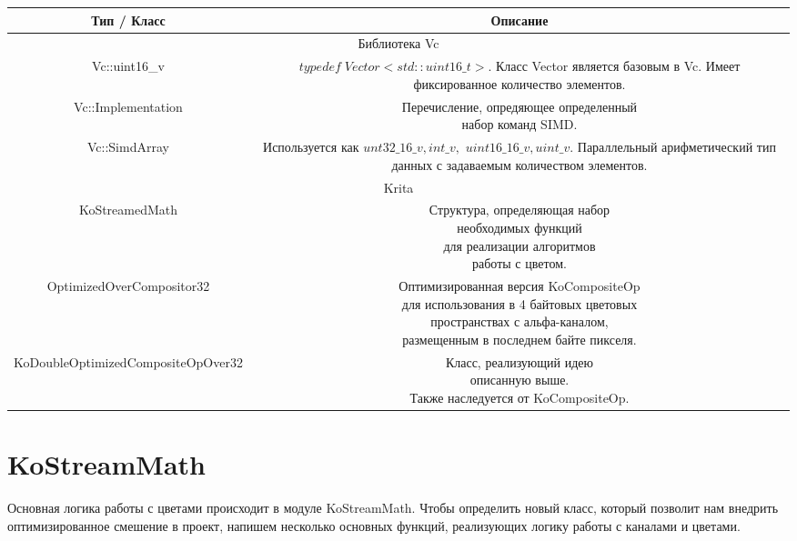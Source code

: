\begin{table}[h!]
	\begin{center}
		\begin{tabular}{|c|c|}
			\hline
			Тип / Класс& Описание \\
			\hline
			\multicolumn{2}{|c|}{Библиотека Vc} \\
			\hline
			Vc::uint16\_v & \specialcell{$typedef\; Vector<std::uint16\_t>$. \\ Класс Vector является базовым в Vc. \\Имеет фиксированное количество \\ элементов.} \\
			\hline
		   Vc::Implementation & \specialcell{Перечисление, опредяющее определенный \\ набор команд SIMD.}\\
		   \hline
			Vc::SimdArray & \specialcell{Используется как $unt32\_16\_v, int\_v,$ \\ $ uint16\_16\_v, uint\_v$. \\ Параллельный арифметический тип \\ данных с задаваемым  количеством\\  элементов.}\\
			\hline
			\multicolumn{2}{|c|}{Krita} \\
			\hline
			KoStreamedMath&  \specialcell{Структура, определяющая набор \\ необходимых  функций \\ для реализации алгоритмов \\ работы с цветом.}\\
			\hline
			OptimizedOverCompositor32 &\specialcell{Оптимизированная версия KoCompositeOp\\ для использования в 4 байтовых цветовых \\ пространствах с альфа-каналом, \\ размещенным в последнем байте пикселя. }\\
			\hline
			 KoDoubleOptimizedCompositeOpOver32 & \specialcell{Класс, реализующий идею \\ описанную выше.\\ Также наследуется от KoCompositeOp.}\\
			\hline
		\end{tabular}
	\end{center}
\end{table} 

\section{KoStreamMath}
Основная логика работы с цветами происходит в модуле KoStreamMath. Чтобы определить новый класс, который позволит нам внедрить оптимизированное смешение в проект, напишем несколько основных функций, реализующих логику работы с каналами и цветами.

